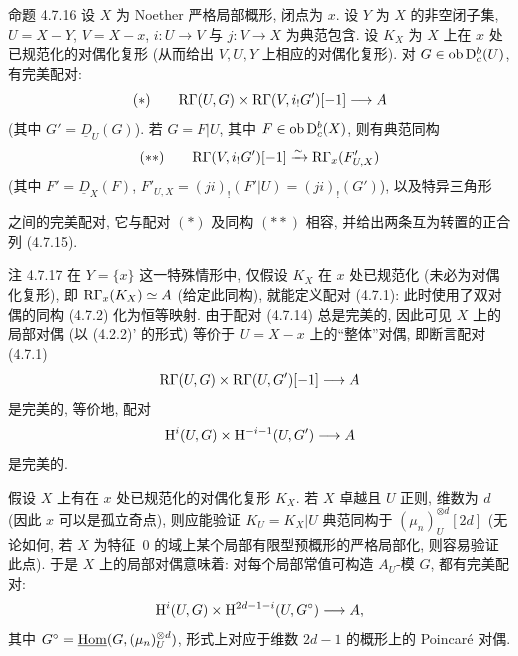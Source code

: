 \begin{statement}{命题 4.7.16}
设 $X$ 为 Noether 严格局部概形, 闭点为 $x$. 设 $Y$ 为 $X$ 的非空闭子集, $U=X-Y$, $V=X-x$, $i:U\to V$ 与 $j:V\to X$ 为典范包含. 设 $K_X$ 为 $X$ 上在 $x$ 处已规范化的对偶化复形 (从而给出 $V,U,Y$ 上相应的对偶化复形). 对 $G\in\operatorname{ob}\mathrm{D}_c^b(U)$, 有完美配对:
\[
(*)\qquad \mathrm R\Gamma(U,G)\times\mathrm R\Gamma(V,i_!G')[-1]\longrightarrow A
\]
(其中 $G'=\underline{D}_U(G)$). 若 $G=F|U$, 其中 $F\in\operatorname{ob}\mathrm{D}_c^b(X)$, 则有典范同构
\[
(**)\qquad \mathrm R\Gamma(V,i_!G')[-1]\xrightarrow{\sim}\mathrm R\Gamma_x(F'_{U,X})
\]
(其中 $F'=\underline{D}_X(F)$, $F'_{U,X}=(ji)_!(F'|U)=(ji)_!(G')$), 以及特异三角形
\begin{center}
\end{center}
之间的完美配对, 它与配对 $(*)$ 及同构 $(**)$ 相容, 并给出两条互为转置的正合列 (4.7.15).
\end{statement}

\begin{statement}{注 4.7.17}
在 $Y=\{x\}$ 这一特殊情形中, 仅假设 $K_X$ 在 $x$ 处已规范化 (未必为对偶化复形), 即 $\mathrm R\Gamma_x(K_X)\simeq A$ (给定此同构), 就能定义配对 (4.7.1): 此时使用了双对偶的同构 (4.7.2) 化为恒等映射. 由于配对 (4.7.14) 总是完美的, 因此可见 $X$ 上的局部对偶 (以 (4.2.2)' 的形式) 等价于 $U=X-x$ 上的“整体”对偶, 即断言配对 (4.7.1)
\[
\mathrm R\Gamma(U,G)\times\mathrm R\Gamma(U,G')[-1]\longrightarrow A
\]
是完美的, 等价地, 配对
\[
\mathrm{H}^i(U,G)\times\mathrm{H}^{-i-1}(U,G')\longrightarrow A
\]
是完美的.

假设 $X$ 上有在 $x$ 处已规范化的对偶化复形 $K_X$. 若 $X$ 卓越且 $U$ 正则, 维数为 $d$ (因此 $x$ 可以是孤立奇点), 则应能验证 $K_U=K_X|U$ 典范同构于 $(\mu_n)_U^{\otimes d}[2d]$ (无论如何, 若 $X$ 为特征~$0$ 的域上某个局部有限型预概形的严格局部化, 则容易验证此点). 于是 $X$ 上的局部对偶意味着: 对每个局部常值可构造 $A_U$-模 $G$, 都有完美配对:
\[
\mathrm{H}^i(U,G)\times\mathrm{H}^{2d-1-i}(U,G^\circ)\longrightarrow A,
\]
其中 $G^\circ=\underline{\operatorname{Hom}}(G,(\mu_n)_U^{\otimes d})$, 形式上对应于维数 $2d-1$ 的概形上的 Poincaré 对偶.
\end{statement}

